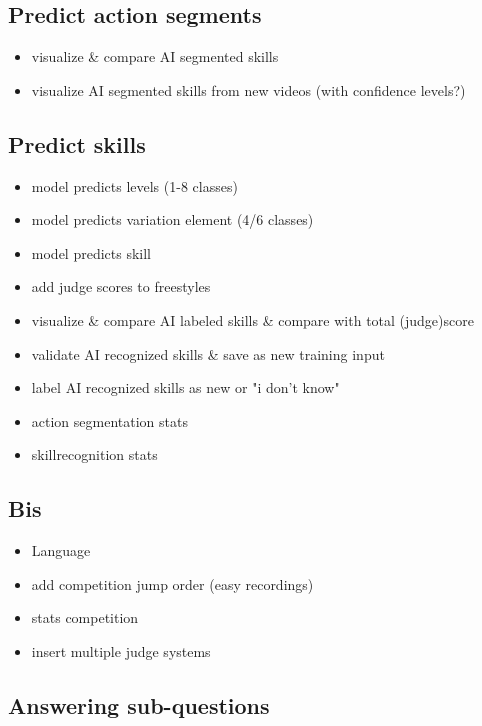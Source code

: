 \subsection{Predict action segments}

\begin{itemize}
    \item visualize \& compare AI segmented skills
    \item visualize AI segmented skills from new videos (with confidence levels?)
\end{itemize}


\subsection{Predict skills}

\begin{itemize}
    \item model predicts levels (1-8 classes)
    \item model predicts variation element (4/6 classes)
    \item model predicts skill
    \item add judge scores to freestyles
    \item visualize \& compare AI labeled skills \& compare with total (judge)score
    \item validate AI recognized skills \& save as new training input
    \item label AI recognized skills as new or "i don't know"
    \item action segmentation stats
    \item skillrecognition stats
\end{itemize}


\subsection{Bis}

\begin{itemize}
    \item Language
    \item add competition jump order (easy recordings)
    \item stats competition
    \item insert multiple judge systems
\end{itemize}



\subsection{Answering sub-questions}
\label{subsec:methodology-sub-questions}

